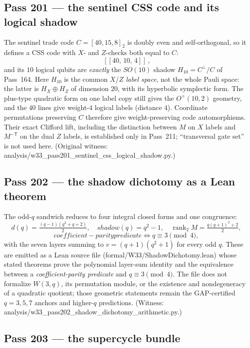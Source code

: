 \documentclass[12pt,a4paper]{article}
\def\mathrm#1{#1}%
\def\texttt#1{#1}%
\def\text#1{#1}%
\theoremstyle{definition}
\begin{document}
\subsection{Pass 201 --- the sentinel CSS code and its logical shadow}
\label{ssec:pass201}

The sentinel trade code $C=[40,15,8]_2$ is doubly even and
self-orthogonal, so it defines a CSS code with $X$- and $Z$-checks both
equal to $C$:
\[
  \boxed{\,[[40,\,10,\,4]]\,,}
\]
and its $10$ logical qubits are \emph{exactly} the $\mathrm{SO}(10)$
shadow $H_{10}=C^\perp/C$ of Pass~164.  Here $H_{10}$ is the common
$X$/$Z$ \emph{label space}, not the whole Pauli space: the latter is
$H_X\oplus H_Z$ of dimension $20$, with its hyperbolic symplectic form.
The plus-type quadratic form on one label copy still gives the
$O^+(10,2)$ geometry, and the $40$ lines give weight-$4$ logical labels
(distance $4$).  Coordinate permutations preserving $C$ therefore give
weight-preserving code automorphisms.  Their exact Clifford lift, including
the distinction between $M$ on $X$ labels and $M^{-\mathsf T}$ on the dual
$Z$ labels, is established only in Pass~211; ``transversal gate set'' is
not used here. (Original witness:
\texttt{analysis/w33\_pass201\_sentinel\_css\_logical\_shadow.py}.)

\subsection{Pass 202 --- the shadow dichotomy as a Lean theorem}
\label{ssec:pass202}

The odd-$q$ sandwich reduces to four integral closed forms and one
congruence:
\[
  d(q)=\tfrac{(q-1)(q^2+q+2)}2,\quad
  \mathrm{shadow}(q)=q^2-1,\quad
  \operatorname{rank}_2M=\tfrac{q(q+1)^2+2}2,
\]
\[
  \text{coefficient-parity predicate}\iff q\equiv3\!\!\pmod4,
\]
with the seven layers summing to $v=(q+1)(q^2+1)$ for every odd $q$. These
are emitted as a Lean source file
(\texttt{formal/W33/ShadowDichotomy.lean}) whose stated theorems prove the
polynomial layer-sum identity and the equivalence between a
\emph{coefficient-parity predicate} and $q\equiv3\pmod4$.  The file does
not formalize $W(3,q)$, its permutation module, or the existence and
nondegeneracy of a quadratic quotient; those geometric statements remain
the GAP-certified $q=3,5,7$ anchors and higher-$q$ predictions. (Witness:
\texttt{analysis/w33\_pass202\_shadow\_dichotomy\_arithmetic.py}.)

\subsection{Pass 203 --- the supercycle bundle}
\label{ssec:pass203}
\end{document}
